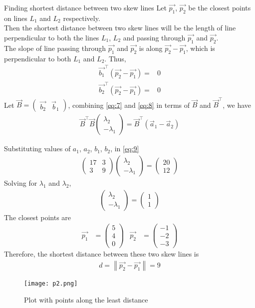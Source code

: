 \documentclass{beamer}
\providecommand{\brak}[1]{\ensuremath{\left(#1\right)}}
\newcommand{\myvec}[1]{\ensuremath{\begin{pmatrix}#1\end{pmatrix}}}
\newcommand\norm[1]{\left\lVert#1\right\rVert}
\begin{document}
\begin{frame}{}
    \begin{block}{Finding shortest distance between two skew lines}
Let $\Vec{p_{1}}$, $\Vec{p_{2}}$ be the closest points on lines $L_{1}$ and $L_{2}$ respectively.\\
Then the shortest distance between two skew lines will be the length of line perpendicular to both the lines $L_{1}$, $L_{2}$ and passing through $\Vec{p_{1}}$ and $\Vec{p_{2}}$.\\
The slope of line passing through $\Vec{p_{1}}$ and $\Vec{p_{2}}$ is along $\Vec{p_{2}}-\Vec{p_{1}}$, which is perpendicular to both $L_{1}$ and $L_{2}$. Thus,
\begin{align}
    \label{eq:7}
    \Vec{b_{1}}^\top\brak{\Vec{p_{2}}-\Vec{p_{1}}}={}&0\\
    \label{eq:8}
     \Vec{b_{2}}^\top\brak{\Vec{p_{2}}-\Vec{p_{1}}}={}&0
\end{align}
Let $\Vec{B}=\myvec{\Vec{b_{2}} & \Vec{b}_{1}}$, combining \eqref{eq:7} and \eqref{eq:8} in terms of $\Vec{B}$ and $\Vec{B}^\top$, we have
\begin{align}
    \label{eq:9}
    \Vec{B}^\top\Vec{B}\myvec{\lambda_{2} \\ -\lambda_{1}}= \Vec{B}^\top\brak{\Vec{a}_{1} - \Vec{a}_{2}}
\end{align} 
\end{block}
\end{frame}
\begin{frame}
Substituting values of $a_{1}$, $a_{2}$, $b_{1}$, $b_{2}$, in \eqref{eq:9}
\begin{align}
    \label{eq:10}
    \myvec{17 & 3 \\ 3 & 9}\myvec{\lambda_{2} \\ -\lambda_{1}}=\myvec{20 \\ 12}
\end{align}
Solving for $\lambda_{1}$ and $\lambda_{2}$, 
\begin{align}
    \label{eq:11}
    \myvec{\lambda_{2} \\ -\lambda_{1}}=\myvec{1 \\ 1}
\end{align}
The closest points are
\begin{align}
    \label{eq:12}
    \Vec{p_{1}} &= \myvec{5\\ 4 \\ 0 }   &    \Vec{p_{2}}&=\myvec{ -1\\-2\\-3}
\end{align}
Therefore, the shortest distance between these two skew lines is
\begin{align}
    \label{eq:18}
    d = \norm{\Vec{p_{2}}-\Vec{p_{1}}} = 9
\end{align}
\end{frame}
\begin{frame}{}
    \begin{figure}[htp]
    \centering
    \texttt{[image: p2.png]}
    \caption{Plot with points along the least distance}
    \label{fig:my_label}
\end{figure}
\end{frame}
\end{document}
